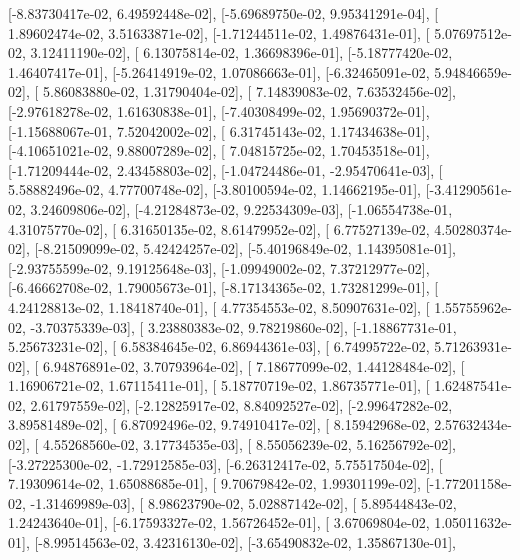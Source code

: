 \documentclass{article}
\begin{document}
       [-8.83730417e-02,  6.49592448e-02],
       [-5.69689750e-02,  9.95341291e-04],
       [ 1.89602474e-02,  3.51633871e-02],
       [-1.71244511e-02,  1.49876431e-01],
       [ 5.07697512e-02,  3.12411190e-02],
       [ 6.13075814e-02,  1.36698396e-01],
       [-5.18777420e-02,  1.46407417e-01],
       [-5.26414919e-02,  1.07086663e-01],
       [-6.32465091e-02,  5.94846659e-02],
       [ 5.86083880e-02,  1.31790404e-02],
       [ 7.14839083e-02,  7.63532456e-02],
       [-2.97618278e-02,  1.61630838e-01],
       [-7.40308499e-02,  1.95690372e-01],
       [-1.15688067e-01,  7.52042002e-02],
       [ 6.31745143e-02,  1.17434638e-01],
       [-4.10651021e-02,  9.88007289e-02],
       [ 7.04815725e-02,  1.70453518e-01],
       [-1.71209444e-02,  2.43458803e-02],
       [-1.04724486e-01, -2.95470641e-03],
       [ 5.58882496e-02,  4.77700748e-02],
       [-3.80100594e-02,  1.14662195e-01],
       [-3.41290561e-02,  3.24609806e-02],
       [-4.21284873e-02,  9.22534309e-03],
       [-1.06554738e-01,  4.31075770e-02],
       [ 6.31650135e-02,  8.61479952e-02],
       [ 6.77527139e-02,  4.50280374e-02],
       [-8.21509099e-02,  5.42424257e-02],
       [-5.40196849e-02,  1.14395081e-01],
       [-2.93755599e-02,  9.19125648e-03],
       [-1.09949002e-02,  7.37212977e-02],
       [-6.46662708e-02,  1.79005673e-01],
       [-8.17134365e-02,  1.73281299e-01],
       [ 4.24128813e-02,  1.18418740e-01],
       [ 4.77354553e-02,  8.50907631e-02],
       [ 1.55755962e-02, -3.70375339e-03],
       [ 3.23880383e-02,  9.78219860e-02],
       [-1.18867731e-01,  5.25673231e-02],
       [ 6.58384645e-02,  6.86944361e-03],
       [ 6.74995722e-02,  5.71263931e-02],
       [ 6.94876891e-02,  3.70793964e-02],
       [ 7.18677099e-02,  1.44128484e-02],
       [ 1.16906721e-02,  1.67115411e-01],
       [ 5.18770719e-02,  1.86735771e-01],
       [ 1.62487541e-02,  2.61797559e-02],
       [-2.12825917e-02,  8.84092527e-02],
       [-2.99647282e-02,  3.89581489e-02],
       [ 6.87092496e-02,  9.74910417e-02],
       [ 8.15942968e-02,  2.57632434e-02],
       [ 4.55268560e-02,  3.17734535e-03],
       [ 8.55056239e-02,  5.16256792e-02],
       [-3.27225300e-02, -1.72912585e-03],
       [-6.26312417e-02,  5.75517504e-02],
       [ 7.19309614e-02,  1.65088685e-01],
       [ 9.70679842e-02,  1.99301199e-02],
       [-1.77201158e-02, -1.31469989e-03],
       [ 8.98623790e-02,  5.02887142e-02],
       [ 5.89544843e-02,  1.24243640e-01],
       [-6.17593327e-02,  1.56726452e-01],
       [ 3.67069804e-02,  1.05011632e-01],
       [-8.99514563e-02,  3.42316130e-02],
       [-3.65490832e-02,  1.35867130e-01],
\end{document}
